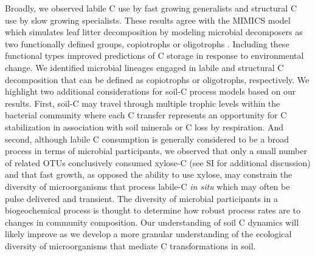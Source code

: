 \documentclass{article}
\begin{document}
Broadly, we observed labile C use by fast growing generalists and structural
C use by slow growing specialists. These results agree with the MIMICS model
which simulates leaf litter decomposition by modeling microbial decomposers
as two functionally defined groups, copiotrophs or oligotrophs
\citep{wieder_2014a}. Including these functional types improved predictions
of C storage in response to environmental change. We identified
microbial lineages engaged in labile and structural C decomposition that
can be defined as copiotrophs or oligotrophs, respectively. We highlight two
additional considerations for soil-C process models based on our results.
First, soil-C may travel through multiple trophic levels within the bacterial
community where each C transfer represents an opportunity for C stabilization
in association with soil minerals or C loss by respiration. And second,
although labile C consumption is generally considered to be a broad process in
terms of microbial participants, we observed that only a small number of
related OTUs conclusively consumed xylose-C (see SI for additional discussion) and
that fast growth, as opposed the ability to use xylose, may constrain the diversity
of microorganisms that process labile-C \textit{in situ} which may often be
pulse delivered and transient. The diversity of microbial participants in a
biogeochemical process is thought to determine how robust process rates are to
changes in community composition. Our understanding of soil C dynamics will
likely improve as we develop a more granular understanding of the ecological
diversity of microorganisms that mediate C transformations in soil.
\end{document}

